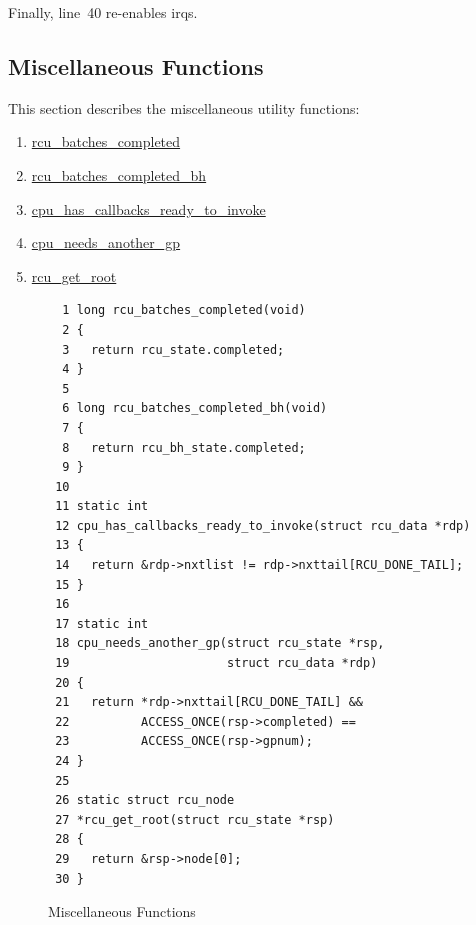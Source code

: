  \QuickQuizEnd

Finally, line~40 re-enables irqs.

\subsection{Miscellaneous Functions}
\label{app:rcuimpl:rcutreewt:Miscellaneous Functions}

This section describes the miscellaneous utility functions:
\begin{enumerate}
\item	\url{rcu_batches_completed}
\item	\url{rcu_batches_completed_bh}
\item	\url{cpu_has_callbacks_ready_to_invoke}
\item	\url{cpu_needs_another_gp}
\item	\url{rcu_get_root}
\end{enumerate}

\begin{figure}[tbp]
{ \scriptsize
\begin{verbatim}
  1 long rcu_batches_completed(void)
  2 {
  3   return rcu_state.completed;
  4 }
  5 
  6 long rcu_batches_completed_bh(void)
  7 {
  8   return rcu_bh_state.completed;
  9 }
 10 
 11 static int
 12 cpu_has_callbacks_ready_to_invoke(struct rcu_data *rdp)
 13 {
 14   return &rdp->nxtlist != rdp->nxttail[RCU_DONE_TAIL];
 15 }
 16 
 17 static int
 18 cpu_needs_another_gp(struct rcu_state *rsp,
 19                      struct rcu_data *rdp)
 20 {
 21   return *rdp->nxttail[RCU_DONE_TAIL] &&
 22          ACCESS_ONCE(rsp->completed) ==
 23          ACCESS_ONCE(rsp->gpnum);
 24 }
 25 
 26 static struct rcu_node
 27 *rcu_get_root(struct rcu_state *rsp)
 28 {
 29   return &rsp->node[0];
 30 }
\end{verbatim}
}
\caption{Miscellaneous Functions}
\label{fig:app:rcuimpl:rcutreewt:Miscellaneous Functions}
\end{figure}

